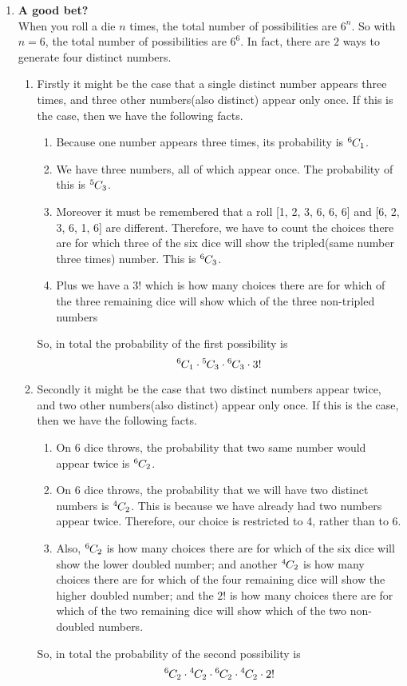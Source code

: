 \documentclass[11pt]{article}
\newcommand*{\permcomb}[4][0mu]{{{}^{#3}\mkern#1#2_{#4}}}
\newcommand*{\comb}[1][-1mu]{\permcomb[#1]{C}}
\begin{document}
\begin{enumerate}
		\item \textbf{A good bet?} \\
		When you roll a die $n$ times, the total number of possibilities are $6^n$. So with $n = 6$, the total number of possibilities are $6^6$. In fact, there are $2$ ways to generate four distinct numbers. 
			\begin{enumerate}
				\item Firstly it might be the case that a single distinct number appears three times, and three other numbers(also distinct) appear only once. If this is the case, then we have the following facts. 
					\begin{enumerate}
						\item Because one number appears three times, its probability is $\comb{6}{1}$.
						\item We have three numbers, all of which appear once. The probability of this is $\comb{5}{3}$.
						\item Moreover it must be remembered that a roll [1, 2, 3, 6, 6, 6] and [6, 2, 3, 6, 1, 6] are different. Therefore, we have to count the choices there are for which three of the six dice will show the tripled(same number three times) number. This is $\comb{6}{3}$. 
						\item Plus we have a $3!$ which is how many choices there are for which of the three remaining dice will show which of the three non-tripled numbers
					\end{enumerate} 
				So, in total the probability of the first possibility is 
				$$ \comb{6}{1} \cdot \comb{5}{3} \cdot \comb{6}{3} \cdot 3! $$
				\item Secondly it might be the case that two distinct numbers appear twice, and two other numbers(also distinct) appear only once. If this is the case, then we have the following facts. 
					\begin{enumerate}
						\item On $6$ dice throws, the probability that two same number would appear twice is $\comb{6}{2}$.
						\item On $6$ dice throws, the probability that we will have two distinct numbers is $\comb{4}{2}$. This is because we have already had two numbers appear twice. Therefore, our choice is restricted to $4$, rather than to $6$. 
						\item Also, $\comb{6}{2}$ is how many choices there are for which of the six dice will show
						the lower doubled number; and another $\comb{4}{2}$ is how many choices there are for which of the four remaining dice will show the higher doubled
						number; and the $2!$ is how many choices there are for which of the two remaining dice will show which of the two non-doubled numbers.
					\end{enumerate}
			So, in total the probability of the second possibility is 
									$$ \comb{6}{2} \cdot \comb{4}{2} \cdot \comb{6}{2} \cdot \comb{4}{2} \cdot 2! $$
			\end{enumerate}
		

\end{enumerate}
\end{document}
